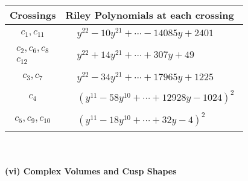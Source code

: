 \documentclass[1p]{elsarticle_modified}
\theoremstyle{definition}
\begin{document}
\begin{tabular}{m{50pt}|m{274pt}}
Crossings & \hspace{64pt}Riley Polynomials at each crossing \\
\hline $$\begin{aligned}c_{1},c_{11}\end{aligned}$$&$\begin{aligned}
&y^{22}-10 y^{21}+\cdots-14085 y+2401
\end{aligned}$\\
\hline $$\begin{aligned}c_{2},c_{6},c_{8}\\c_{12}\end{aligned}$$&$\begin{aligned}
&y^{22}+14 y^{21}+\cdots+307 y+49
\end{aligned}$\\
\hline $$\begin{aligned}c_{3},c_{7}\end{aligned}$$&$\begin{aligned}
&y^{22}-34 y^{21}+\cdots+17965 y+1225
\end{aligned}$\\
\hline $$\begin{aligned}c_{4}\end{aligned}$$&$\begin{aligned}
&(y^{11}-58 y^{10}+\cdots+12928 y-1024)^{2}
\end{aligned}$\\
\hline $$\begin{aligned}c_{5},c_{9},c_{10}\end{aligned}$$&$\begin{aligned}
&(y^{11}-18 y^{10}+\cdots+32 y-4)^{2}
\end{aligned}$\\
\hline
\end{tabular}\\~\\
\newpage\flushleft \textbf{(vi) Complex Volumes and Cusp Shapes}
\end{document}
